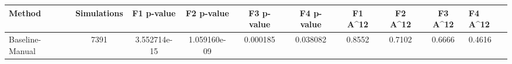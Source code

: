 \begin{tabular}{lcccccccc}
\toprule
         Method &  Simulations &   F1 p-value &   F2 p-value &  F3 p-value &  F4 p-value &  F1 A^12 &  F2 A^12 &  F3 A^12 &  F4 A^12 \\
\midrule
Baseline-Manual &         7391 & 3.552714e-15 & 1.059160e-09 &    0.000185 &    0.038082 &   0.8552 &   0.7102 &   0.6666 &   0.4616 \\
\bottomrule
\end{tabular}
